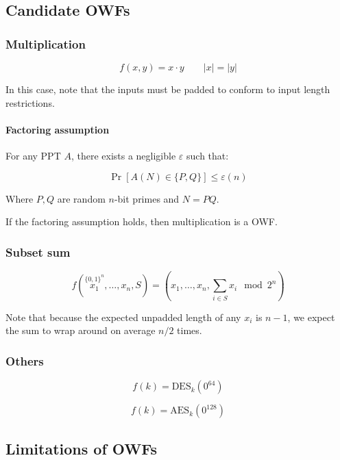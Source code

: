 \documentclass{idc_msc}
\begin{document}
\subsection{Candidate OWFs}

\subsubsection{Multiplication}

\[
  f(x, y) = x \cdot y \qquad |x| = |y|
\]

In this case, note that the inputs must be padded to conform to input length restrictions.

\paragraph{Factoring assumption}

For any PPT \(A\), there exists a negligible \(\varepsilon\) such that:

\[
  \Pr[A(N) \in \{P, Q\}] \le \varepsilon(n)
\]

Where \(P, Q\) are random \(n\)-bit primes and \(N=PQ\).

If the factoring assumption holds, then multiplication is a OWF.

\subsubsection{Subset sum}

\[
  f(\overset{\{0,1\}^n}{x_1}, \ldots, x_n, S) = (x_1, \ldots, x_n, \sum_{i \in S} x_i \mod 2^n)
\]

Note that because the expected unpadded length of any \(x_i\) is \(n-1\), we expect the sum to wrap around on average \(n/2\) times.

\subsubsection{Others}

\[
  f(k) = \mathrm{DES}_k(0^{64})
\]

\[
  f(k) = \mathrm{AES}_k(0^{128})
\]

\subsection{Limitations of OWFs}
\end{document}
